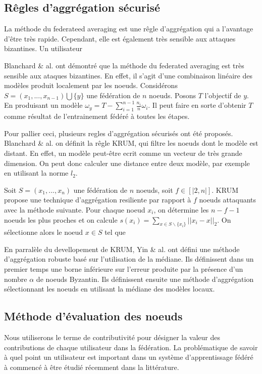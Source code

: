 \documentclass[stage3a]{tnreport} %
\begin{document}
\subsection{Rêgles d'aggrégation sécurisé}

La méthode du federateed averaging est une rêgle d'aggrégation qui a l'avantage d'être très rapide. Cependant, elle est également très sensible aux attaques bizantines. Un utilisateur 

Blanchard \& al. ont démontré que la méthode du federated averaging est très sensible aux ataques bizantines. En effet, il s'agit d'une combinaison linéaire des modèles produit localement par les noeuds. Considérons $S=(x_1,...,x_{n-1})\bigcup \{y\}$ une fédération de $n$ noeuds. Posons $T$ l'objectif de $y$. En produisant un modèle $\omega_y= T - \sum_{i=1}^{n-1} \frac{n_i}{n} \omega_i $. Il peut faire en sorte d'obtenir $T$ comme résultat de l'entrainement fédéré à toutes les étapes.

Pour pallier ceci, plusieurs regles d'aggrégation sécurisés ont été proposés. Blanchard \& al. on définit la rêgle KRUM, qui filtre les noeuds dont le modèle est distant. En effet, un modèle peut-être ecrit comme un vecteur de très grande dimension. On peut donc calculer une distance entre deux modèle, par exemple en utilisant la norme $l_2$. 

Soit $S=(x_1,...,x_n)$ une fédération de $n$ noeuds, soit $f\in[|2,n|]$. KRUM propose une technique d'aggrégation resiliente par rapport à $f$ noeuds attaquants avec la méthode suivante. Pour chaque noeud $x_i$, on détermine les $n-f-1$ noeuds les plus proches et on calcule $s(x_i)=\sum_{x\in S \backslash \{x_i\}} ||x_i - x||_2$. On sélectionne alors le noeud $x \in S$ tel que 

En parralèle du devellopement de KRUM, Yin \& al. ont défini une méthode d'aggrégation robuste basé sur l'utilisation de la médiane. Ils définissent dans un premier temps une borne inférieure sur l'erreur produite par la présence d'un nombre $\alpha$ de noeuds Byzantin. Ils définissent ensuite une méthode d'aggrégation sélectionnant les noeuds en utilisant la médiane des modèles locaux.


\subsection{Méthode d'évaluation des noeuds}


Nous utiliserons le terme de contributivité pour désigner la valeur des contributions de chaque utilisateur dans la fédération. La problématique de savoir à quel point un utilisateur est important dans un système d'apprentissage fédéré à commencé à être étudié récemment dans la littérature.
\end{document}
